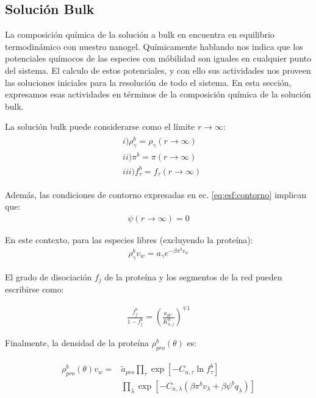 \subsection{Soluci\'on Bulk}\label{sec:esf:bulk}

La composici\'on qu\'imica de la soluci\'on a bulk en encuentra en equilibrio termodin\'amico con nuestro nanogel. Qu\'imicamente hablando nos indica que los potenciales qu\'imocos de las especies con m\'obilidad son iguales en cualquier punto del sistema. 
El calculo de estos potenciales, y con ello sus actividades nos proveen  las soluciones iniciales para la resoluci\'on de todo el sistema.
En esta secci\'on, expresamos esas actividades en t\'erminos de la composici\'on qu\'imica de la soluci\'on bulk.

La soluci\'on bulk  puede considerarse como el límite $r \rightarrow \infty$:
\begin{align}
	\begin{aligned}
		& i)\rho^b_\gamma =\rho_\gamma (r \rightarrow \infty) \\
		& ii) \pi^b = \pi(r \rightarrow \infty) \\
		& iii) f_\tau^b = f_\tau(r \rightarrow \infty)
	\end{aligned}
\end{align}

Adem\'as, las condiciones de contorno expresadas en ec. \ref{eq:esf:contorno} implican que:
\begin{align}
	\psi(r \rightarrow \infty) = 0
\end{align}

En este contexto, para las especies libres (excluyendo la prote\'ina):
\begin{align}
	\rho_\gamma^b v_w = a_\gamma e^{-\beta\pi^bv_w}
	\label{eq:esf:free-bulk}
\end{align}

El grado de disociaci\'on $f_j$ de la prote\'ina y los segmentos de la red pueden escribirse como:

\begin{align}
	\frac{f_j^b}{1-f_j^b} = \left(\frac{a_{H^+}}{K^0_{a,j}}\right)^{\mp 1}
\end{align}

Finalmente, la densidad de la prote\'ina $\rho_{pro}^b(\theta)$ es:

\begin{align}
	\begin{aligned}
		\rho^b_{pro}(\theta)v_w = &\tilde{a}_{pro} \prod_\tau\exp\left[-C_{n,\tau} \ln f^b_\tau\right] \\
		&\prod_\lambda \exp \left[-C_{n,\lambda} (\beta\pi^b v_\lambda + \beta\psi^b q_\lambda ) \right]
	\end{aligned}
	\label{eq:esf:bulk-protein}
\end{align}

